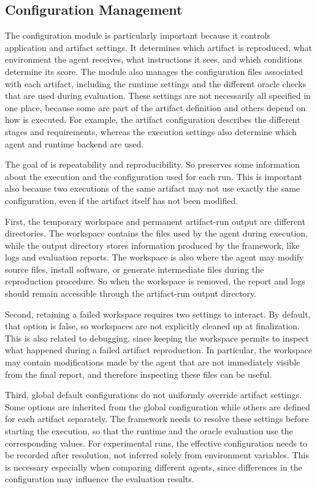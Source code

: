 \subsection{Configuration Management}

The configuration module is particularly important because it controls 
  application and artifact settings.
It determines which artifact is reproduced, what environment the agent receives,
  what instructions it sees, and which conditions determine its score.
The module also manages the configuration files associated with each artifact,
  including the runtime settings and the different oracle checks that are used 
    during evaluation.
These settings are not necessarily all specified in one place, because some are part 
  of the artifact definition and others depend on how \aebench is executed.
For example, the artifact configuration describes the different stages and requirements,
  whereas the execution settings also determine which agent and runtime backend are used.

The goal of \aebench is repeatability and reproducibility. So \aebench preserves
  some information about the execution and the configuration used for each run.
This is important also because two executions of the same artifact may not use exactly
  the same configuration, even if the artifact itself has not been modified.

First, the temporary workspace and permanent artifact-run output are different directories.
The workspace contains the files used by the agent during execution, while 
  the output directory stores information produced by the framework, 
  like logs and evaluation reports.
The workspace is also where the agent may modify source files, install software, or generate
  intermediate files during the reproduction procedure.
So when the workspace is removed, the report and logs should remain accessible 
  through the artifact-run output directory.

Second, retaining a failed workspace requires two settings to interact.
By default, that option is false, so workspaces are not explicitly cleaned 
  up at finalization.
This is also related to debugging, since keeping the workspace permits to inspect 
  what happened during a failed artifact reproduction.
In particular, the workspace may contain modifications made by the agent that are 
  not immediately visible from the final report, and therefore inspecting these 
  files can be useful.

Third, global default configurations do not uniformly override artifact settings.
  Some options are inherited from the global configuration while others are defined for
  each artifact separately.
The framework needs to resolve these settings before starting the execution,
  so that the runtime and the oracle evaluation use the corresponding values.
  For experimental runs, the effective configuration
  needs to be recorded after resolution, not inferred solely from environment variables.
This is necessary especially when comparing different agents, since differences in the
  configuration may influence the evaluation results.

